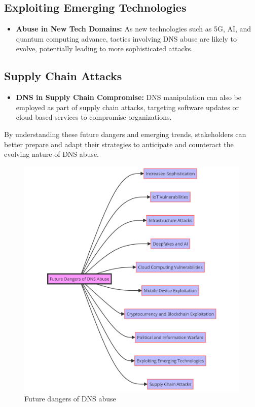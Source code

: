 \subsection{Exploiting Emerging Technologies}
\begin{itemize}
    \item \textbf{Abuse in New Tech Domains:} As new technologies such as 5G, AI, and quantum computing advance, tactics involving DNS abuse are likely to evolve, potentially leading to more sophisticated attacks.\cite{brunner2021cybersecurity}
\end{itemize}

\subsection{Supply Chain Attacks}
\begin{itemize}
    \item \textbf{DNS in Supply Chain Compromise:} DNS manipulation can also be employed as part of supply chain attacks, targeting software updates or cloud-based services to compromise organizations.\cite{boyson2014cyber}
\end{itemize}

By understanding these future dangers and emerging trends, stakeholders can better prepare and adapt their strategies to anticipate and counteract the evolving nature of DNS abuse.

\clearpage
\captionsetup{font= small}
\begin{figure}[ht!]
\centering
\includegraphics[width=1.2\textwidth]{background/DNSfutureDanger.png}
\caption{Future dangers of DNS abuse}
\label{fig:figureFive}
\end{figure}
\clearpage

